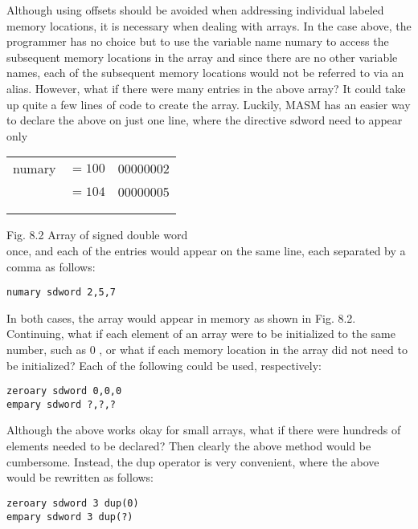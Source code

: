 \documentclass[10pt]{article}
\begin{document}
Although using offsets should be avoided when addressing individual labeled memory locations, it is necessary when dealing with arrays. In the case above, the programmer has no choice but to use the variable name numary to access the subsequent memory locations in the array and since there are no other variable names, each of the subsequent memory locations would not be referred to via an alias. However, what if there were many entries in the above array? It could take up quite a few lines of code to create the array. Luckily, MASM has an easier way to declare the above on just one line, where the directive sdword need to appear only

\begin{center}
\begin{tabular}{rl|l|}
numary & $=100$ & 00000002 \\
 & $=104$ & 00000005 \\
 &  &  \\
 &  &  \\
\end{tabular}
\end{center}

Fig. 8.2 Array of signed double word\\
once, and each of the entries would appear on the same line, each separated by a comma as follows:

\begin{verbatim}
numary sdword 2,5,7
\end{verbatim}

In both cases, the array would appear in memory as shown in Fig. 8.2.\\
Continuing, what if each element of an array were to be initialized to the same number, such as 0 , or what if each memory location in the array did not need to be initialized? Each of the following could be used, respectively:

\begin{verbatim}
zeroary sdword 0,0,0
empary sdword ?,?,?
\end{verbatim}

Although the above works okay for small arrays, what if there were hundreds of elements needed to be declared? Then clearly the above method would be cumbersome. Instead, the dup operator is very convenient, where the above would be rewritten as follows:

\begin{verbatim}
zeroary sdword 3 dup(0)
empary sdword 3 dup(?)
\end{verbatim}
\end{document}
